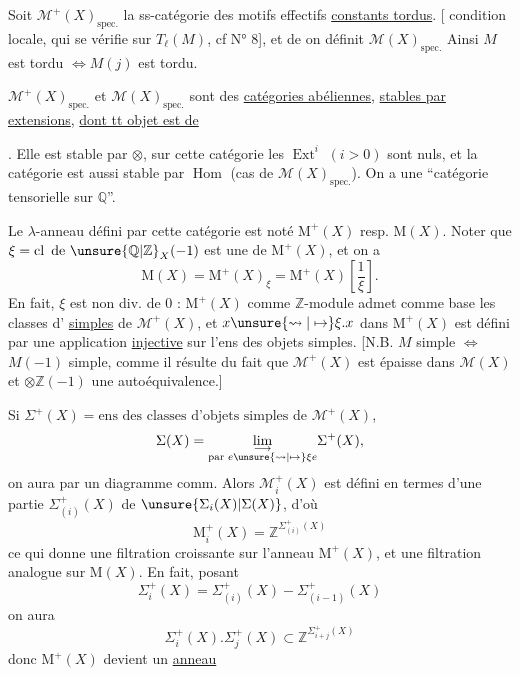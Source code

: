Soit $\mathcal{M}^+(X)_{\mathrm{spec.}}$ la ss-catégorie des
motifs effectifs \uline{constants tordus}.
[ condition locale, qui se vérifie sur
$T_\ell(M)$, cf N° 8], et de  on définit
$\mathcal{M}(X)_{\mathrm{spec.}}$ 
Ainsi
$M$ est tordu $\Longleftrightarrow M(j)$ est tordu.

$\mathcal{M}^+(X)_{\mathrm{spec.}}$ et $\mathcal{M}(X)_{\mathrm{spec.}}$ sont des
\uline{catégories abéliennes},
\uline{stables par extensions}, \uline{dont tt objet est de}

. Elle est stable par $\otimes$,
sur cette catégorie les $\operatorname{Ext}^i$ $(i>0)$ sont
nuls, et la catégorie est aussi stable
par $\operatorname{Hom}$ (cas de $\mathcal{M}(X)_{\mathrm{spec.}}$). On a
une ``catégorie tensorielle sur $\mathbb{Q}$''.

Le  $\lambda$-anneau défini par cette
catégorie est noté $\mathrm{M}^+(X)$ resp. $\mathrm{M}(X)$.
Noter que $\xi=\operatorname{cl}\text{ de }\unsure{\mathbb{Q}|\mathbb{Z}}_X(-1)$ est une
 de $\mathrm{M}^+(X)$, et on a
\[
\mathrm{M}(X)=\mathrm{M}^+(X)_\xi=\mathrm{M}^+(X)\left[\frac1\xi\right].
\]
En fait, $\xi$ est non div. de $0$ :
$\mathrm{M}^+(X)$ comme $\mathbb{Z}$-module admet comme
base les classes d' \uline{simples} de
$\mathcal{M}^+(X)$, et $x\unsure{\rightsquigarrow|\mapsto}\xi.x$ dans $\mathrm{M}^+(X)$ est défini
par une application \uline{injective} sur l'ens des
objets simples. [N.B. $M$ simple 
$\Longleftrightarrow$ 
$M(-1)$ simple, comme il résulte du
fait que $\mathcal{M}^+(X)$ est épaisse dans $\mathcal{M}(X)$ et
$\otimes\mathbb{Z}(-1)$ une autoéquivalence.]

Si $\Sigma^+(X)=\text{ens des classes d'objets simples}$
de $\mathcal{M}^+(X)$,
\[
\Sigma(X)=\underset{\substack{\longrightarrow\\
\text{par }e\unsure{\rightsquigarrow|\mapsto}\xi e}}{\lim}\Sigma^+(X),
\]
on aura par  un diagramme comm.
Alors $\mathcal{M}_i^+(X)$ est défini en termes
d'une partie $\Sigma_{(i)}^+(X)$ de
$\unsure{\Sigma_i(X)|\Sigma(X)}$,
d'où
\[
\mathrm{M}_i^+(X)=\mathbb{Z}^{\Sigma_{(i)}^+(X)}
\]
ce qui donne une filtration croissante
sur l'anneau $\mathrm{M}^+(X)$, et une
filtration analogue sur $\mathrm{M}(X)$.
En fait, posant
\[
\Sigma_i^+(X)=\Sigma_{(i)}^+(X)-\Sigma_{(i-1)}^+(X)
\]
on aura 
\[
\Sigma_i^+(X).\Sigma_j^+(X)\subset
\mathbb{Z}^{\Sigma_{i+j}^+(X)}
\]
donc $\mathrm{M}^+(X)$ devient un \uline{anneau}

